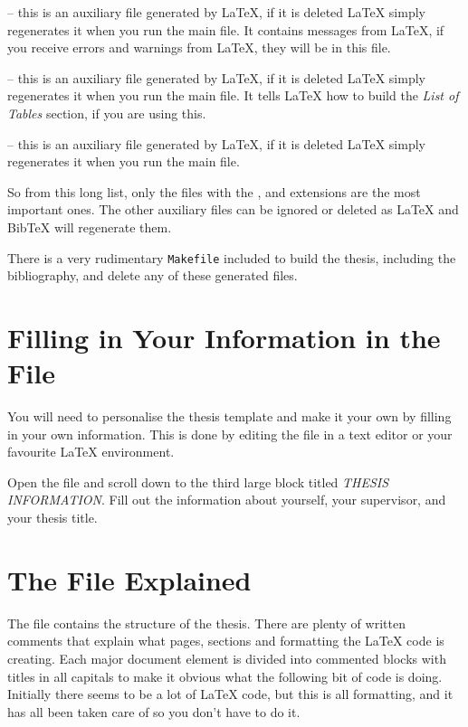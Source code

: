  -- this is an auxiliary file generated by \LaTeX{},
if it is deleted \LaTeX{} simply regenerates it when you run the main
 file. It contains messages from \LaTeX{}, if you receive
errors and warnings from \LaTeX{}, they will be in this 
file.

 -- this is an auxiliary file generated by \LaTeX{},
if it is deleted \LaTeX{} simply regenerates it when you run the main
 file. It tells \LaTeX{} how to build the \emph{List of
  Tables} section, if you are using this.

 -- this is an auxiliary file generated by \LaTeX{},
if it is deleted \LaTeX{} simply regenerates it when you run the main
 file.

So from this long list, only the files with the , 
and  extensions are the most important ones. The other
auxiliary files can be ignored or deleted as \LaTeX{} and BibTeX will
regenerate them.

There is a very rudimentary \texttt{Makefile} included to build the
thesis, including the bibliography, and delete any of these generated
files.


\section{Filling in Your Information in the  File}
\label{sec:filling}

You will need to personalise the thesis template and make it your own by
filling in your own information. This is done by editing the
 file in a text editor or your favourite LaTeX
environment.

Open the file and scroll down to the third large block titled
\emph{THESIS INFORMATION}. Fill out the information about yourself, your
supervisor, and your thesis title. 


\section{The  File Explained}
\label{sec:main}

The  file contains the structure of the thesis. There are
plenty of written comments that explain what pages, sections and
formatting the \LaTeX{} code is creating. Each major document element is
divided into commented blocks with titles in all capitals to make it
obvious what the following bit of code is doing. Initially there seems
to be a lot of \LaTeX{} code, but this is all formatting, and it has all
been taken care of so you don't have to do it.

